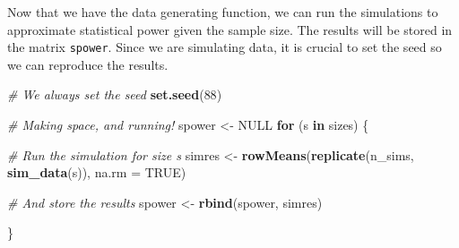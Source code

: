 \documentclass[
]{book}
\newenvironment{Shaded}{\begin{snugshade}}{\end{snugshade}}
\newcommand{\AttributeTok}[1]{\textcolor[rgb]{0.13,0.29,0.53}{#1}}
\newcommand{\CommentTok}[1]{\textcolor[rgb]{0.56,0.35,0.01}{\textit{#1}}}
\newcommand{\ConstantTok}[1]{\textcolor[rgb]{0.56,0.35,0.01}{#1}}
\newcommand{\ControlFlowTok}[1]{\textcolor[rgb]{0.13,0.29,0.53}{\textbf{#1}}}
\newcommand{\DecValTok}[1]{\textcolor[rgb]{0.00,0.00,0.81}{#1}}
\newcommand{\FunctionTok}[1]{\textcolor[rgb]{0.13,0.29,0.53}{\textbf{#1}}}
\newcommand{\NormalTok}[1]{#1}
\newcommand{\OtherTok}[1]{\textcolor[rgb]{0.56,0.35,0.01}{#1}}
\newcommand{\SpecialCharTok}[1]{\textcolor[rgb]{0.81,0.36,0.00}{\textbf{#1}}}
\newcommand{\StringTok}[1]{\textcolor[rgb]{0.31,0.60,0.02}{#1}}
\begin{document}
\begin{Shaded}
\end{Shaded}

Now that we have the data generating function, we can run the simulations to approximate statistical power given the sample size. The results will be stored in the matrix \texttt{spower}. Since we are simulating data, it is crucial to set the seed so we can reproduce the results.

\begin{Shaded}
\begin{Highlighting}[]
\CommentTok{\# We always set the seed}
\FunctionTok{set.seed}\NormalTok{(}\DecValTok{88}\NormalTok{) }

\CommentTok{\# Making space, and running!}
\NormalTok{spower }\OtherTok{\textless{}{-}} \ConstantTok{NULL}
\ControlFlowTok{for}\NormalTok{ (s }\ControlFlowTok{in}\NormalTok{ sizes) \{}

  \CommentTok{\# Run the simulation for size s}
\NormalTok{  simres }\OtherTok{\textless{}{-}} \FunctionTok{rowMeans}\NormalTok{(}\FunctionTok{replicate}\NormalTok{(n\_sims, }\FunctionTok{sim\_data}\NormalTok{(s)), }\AttributeTok{na.rm =} \ConstantTok{TRUE}\NormalTok{)}

  \CommentTok{\# And store the results}
\NormalTok{  spower }\OtherTok{\textless{}{-}} \FunctionTok{rbind}\NormalTok{(spower, simres)}

\NormalTok{\}}
\end{Highlighting}
\end{Shaded}
\end{document}
